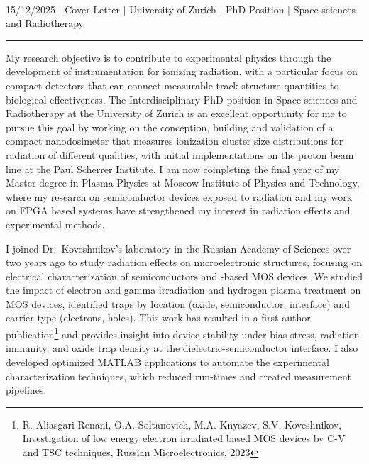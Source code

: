 \documentclass[a4paper,11pt]{article}
\begin{document}
\begin{center}
    {\Huge \scshape {\fontsize{25}{30}\selectfont{Reza}} {\fontsize{25}{30}}} \\ \vspace{3pt}
    {\small {15/12/2025}} $|$
    {\small {Cover Letter}} $|$
    {\small {University of Zurich}} $|$
    {\small {PhD Position}} $|$
    {\small {Space sciences and Radiotherapy}}
    \vspace{-10pt}
\end{center}
\vspace{-10pt}
\noindent\rule{\textwidth}{0.5pt}

My research objective is to contribute to experimental physics through the development of instrumentation for ionizing radiation, with a particular focus on compact detectors that can connect measurable track structure quantities to biological effectiveness. The Interdisciplinary PhD position in Space sciences and Radiotherapy at the University of Zurich is an excellent opportunity for me to pursue this goal by working on the conception, building and validation of a compact nanodosimeter that measures ionization cluster size distributions for radiation of different qualities, with initial implementations on the proton beam line at the Paul Scherrer Institute. I am now completing the final year of my Master degree in Plasma Physics at Moscow Institute of Physics and Technology, where my research on semiconductor devices exposed to radiation and my work on FPGA based systems have strengthened my interest in radiation effects and experimental methods. 

\vspace{10pt}
I joined Dr.\ Koveshnikov's laboratory in the Russian Academy of Sciences over two years ago to study radiation effects on microelectronic structures, focusing on electrical characterization of semiconductors and -based MOS devices. We studied the impact of electron and gamma irradiation and hydrogen plasma treatment on MOS devices, identified traps by location (oxide, semiconductor, interface) and carrier type (electrons, holes). This work has resulted in a first-author publication\footnote{R. Aliasgari Renani, O.A. Soltanovich, M.A. Knyazev, S.V. Koveshnikov, Investigation of low energy electron irradiated  based MOS devices by C-V and TSC techniques, Russian Microelectronics, 2023} and provides insight into device stability under bias stress, radiation immunity, and oxide trap density at the dielectric-semiconductor interface. I also developed optimized MATLAB applications to automate the experimental characterization techniques, which reduced run-times and created measurement pipelines. 
\end{document}
